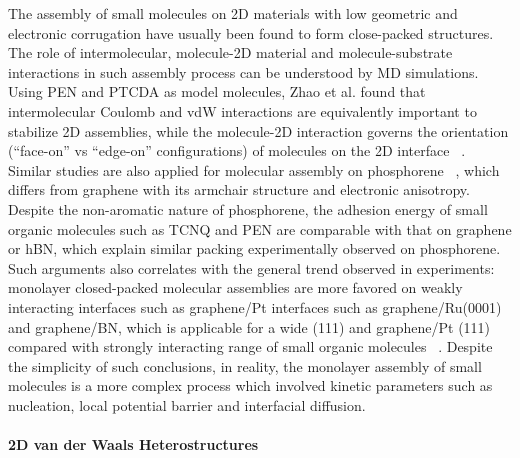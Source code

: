 The assembly of small molecules on 2D materials with low geometric and
electronic corrugation have usually been found to form close-packed
structures. The role of intermolecular, molecule-2D material and
molecule-substrate interactions in such assembly process can be
understood by MD simulations. Using PEN and PTCDA as model molecules,
Zhao et al. found that inter\-molecular Coulomb and vdW interactions
are equivalently important to stabilize 2D assemblies, while the
molecule-2D interaction governs the orientation (\ie ``face-on'' vs
``edge-on'' configurations) of molecules on the 2D interface
~\cite{Zhao_2015_self_assemb_gr_MD}. Similar studies are also applied
for molecular assembly on phosphorene
~\cite{Mukhopadhyay_2017_cryst_BP}, which differs from graphene with
its armchair structure and electronic anisotropy. Despite the
non-aromatic nature of phosphorene, the adhesion energy of small
organic molecules such as TCNQ and PEN are comparable with that on
graphene or hBN, which explain similar packing experimentally observed
on phosphorene. Such arguments also correlates with the general trend
observed in experiments: monolayer closed-packed molecular assemblies
are more favored on weakly interacting interfaces such as graphene/Pt
interfaces such as graphene/\allowbreak{}Ru(0001) and graphene/BN,
which is applicable for a wide (111) and graphene/Pt (111) compared
with strongly interacting range of small organic molecules
~\cite{Hamalainen_2012_CoPc_gr_Ir,Xiao_2013_jacs_CuPc_gr,Barja_2010_assembl_donor_gr,Jung_2014_C60_gr_Cu,Yang_2012_MPc_gr_metal,Hamalainen_2012_CoPc_gr_Ir,Tsai_2015_TCNQ_gr_hbn,Stradi_2014_TCNQ_gr_Ru}.
%
Despite the simplicity of such conclusions, in reality, the monolayer
assembly of small molecules is a more complex process which involved
kinetic parameters such as nucleation, local potential barrier and
interfacial diffusion.


\paragraph{2D van der Waals Heterostructures}
\label{sec:org77ea5bc}

